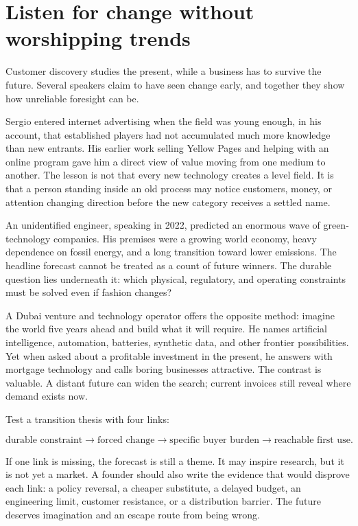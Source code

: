 \section{Listen for change without worshipping trends}

Customer discovery studies the present, while a business has to survive the
future. Several speakers claim to have seen change early, and together they
show how unreliable foresight can be.

Sergio entered internet advertising when the field was young enough, in his
account, that established players had not accumulated much more knowledge than
new entrants. His earlier work selling Yellow Pages and helping with an online
program gave him a direct view of value moving from one medium to another. The
lesson is not that every new technology creates a level field. It is that a
person standing inside an old process may notice customers, money, or attention
changing direction before the new category receives a settled name.

An unidentified engineer, speaking in 2022, predicted an enormous wave of
green-technology companies. His premises were a growing world economy, heavy
dependence on fossil energy, and a long transition toward lower emissions. The
headline forecast cannot be treated as a count of future winners. The durable
question lies underneath it: which physical, regulatory, and operating
constraints must be solved even if fashion changes?

A Dubai venture and technology operator offers the opposite method: imagine
the world five years ahead and build what it will require. He names artificial
intelligence, automation, batteries, synthetic data, and other frontier
possibilities. Yet when asked about a profitable investment in the present, he
answers with mortgage technology and calls boring businesses attractive. The
contrast is valuable. A distant future can widen the search; current invoices
still reveal where demand exists now.

Test a transition thesis with four links:

\begin{equation}
\text{durable constraint}
  \longrightarrow \text{forced change}
  \longrightarrow \text{specific buyer burden}
  \longrightarrow \text{reachable first use}.
\end{equation}

If one link is missing, the forecast is still a theme. It may inspire research,
but it is not yet a market. A founder should also write the evidence that would
disprove each link: a policy reversal, a cheaper substitute, a delayed budget,
an engineering limit, customer resistance, or a distribution barrier. The
future deserves imagination and an escape route from being wrong.

